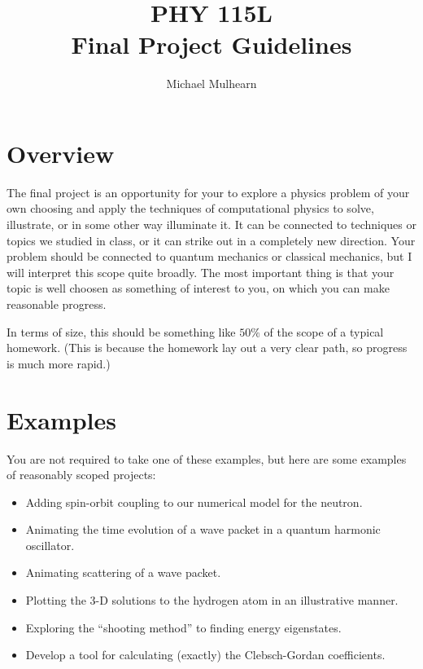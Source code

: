 \documentclass[12pt]{article}
\begin{document}
\newcommand{\ihbar}{\ensuremath{i \hbar}}
\newcommand{\Pss}{\ensuremath{\Psi^*}}
\newcommand{\dPsidt}{\ensuremath{ \frac{\partial \Psi}{\partial t} }}
\newcommand{\dPsidx}{\ensuremath{ \frac{\partial \Psi}{\partial x} }}
\newcommand{\ddPsidx}{\ensuremath{ \frac{\partial^2 \Psi}{\partial x^2} }}
\newcommand{\dPssdt}{\ensuremath{ \frac{\partial \Psi^*}{\partial t} }}
\newcommand{\dPssdx}{\ensuremath{ \frac{\partial \Psi^*}{\partial x} }}
\newcommand{\ddPssdx}{\ensuremath{ \frac{\partial^2 \Psi^*}{\partial x^2} }}

\newcommand{\dphidt}{\ensuremath{ \frac{d \phi}{dt} }}
\newcommand{\dpsidx}{\ensuremath{ \frac{d \psi}{dx} }}
\newcommand{\ddpsidx}{\ensuremath{ \frac{d^2 \psi}{dx^2} }}


\title{PHY 115L \\ Final Project Guidelines }
\author{Michael Mulhearn}

\maketitle

\section{Overview}

The final project is an opportunity for your to explore a physics
problem of your own choosing and apply the techniques of computational
physics to solve, illustrate, or in some other way illuminate it.  It
can be connected to techniques or topics we studied in class, or it
can strike out in a completely new direction.  Your problem should be
connected to quantum mechanics or classical mechanics, but I will
interpret this scope quite broadly.  The most important thing is that
your topic is well choosen as something of interest to you, on which
you can make reasonable progress.

In terms of size, this should be something like $50\%$ of the scope of a typical homework.  (This is because the homework lay out a very clear path, so progress is much more rapid.)

\section{Examples}

You are not required to take one of these examples, but here are some examples of reasonably scoped projects:
\begin{itemize}
\item Adding spin-orbit coupling to our numerical model for the neutron.
\item Animating the time evolution of a wave packet in a quantum harmonic oscillator.
\item Animating scattering of a wave packet.
\item Plotting the 3-D solutions to the hydrogen atom in an illustrative manner.
\item Exploring the ``shooting method'' to finding energy eigenstates.
\item Develop a tool for calculating (exactly) the Clebsch-Gordan coefficients.
\end{itemize}
\end{document}
